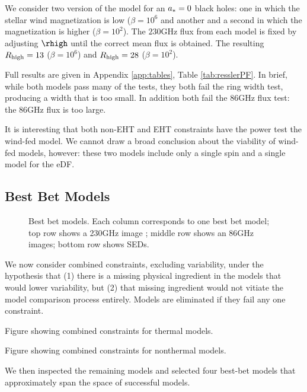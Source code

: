 We consider two version of the model for an $a_* = 0$ black holes: one in which the stellar wind magnetization is low ($\beta = 10^6$ and another and a second in which the magnetization is higher ($\beta = 10^2$).  The $230$GHz flux from each model is fixed by adjusting $\rhigh$ until the correct mean flux is obtained.  The resulting $R_\mathrm{high} = 13$ ($\beta = 10^6$) and $R_\mathrm{high} = 28$ ($\beta = 10^2$).  

Full results are given in Appendix \ref{app:tables}, Table \ref{tab:resslerPF}.  In brief, while both models pass many of the tests, they both fail the ring width test, producing a width that is too small.  In addition both fail the 86GHz flux test: the 86GHz flux is too large.  

It is interesting that both non-EHT and EHT constraints have the power test the wind-fed model.  We cannot draw a broad conclusion about the viability of wind-fed models, however: these two models include only a single spin and a single model for the eDF.   

\subsection{Best Bet Models}

\begin{figure}
    \centering
    \caption{Best bet models.  Each column corresponds to one best bet model; top row shows a 230GHz image ; middle row shows an 86GHz images; bottom row shows SEDs.}
    \label{fig:my_label}
\end{figure}


We now consider combined constraints, excluding variability, under the hypothesis that (1) there is a missing physical ingredient in the models that would lower variability, but (2) that missing ingredient would not vitiate the model comparison process entirely.  Models are eliminated if they fail any one constraint.

Figure showing combined constraints for thermal models.

Figure showing combined constraints for nonthermal models.

We then inspected the remaining models and selected four best-bet models that approximately span the space of successful models.  
